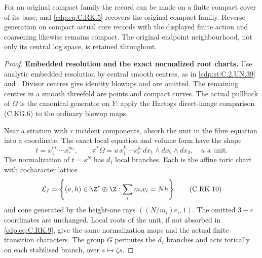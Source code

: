 \begin{proposition}
For an original compact family the record can
be made on a finite compact cover of its base,
and \eqref{cdp:eq:C.RK.5} recovers the original compact
family. Reverse generation on compact actual
core records with the displayed finite action
and coarsening likewise remains compact.
The original endpoint neighbourhood, not only
its central log space, is retained throughout.
\end{proposition}

\begin{proof}
\par\medskip\noindent\textbf{Embedded resolution and the exact normalized root charts.}
Use analytic embedded resolution by central
smooth centres, as in \ref{cdp:st:C.2.UN.39} and
\cite[Theorems~1.6 and1.10]{BierstoneMilman1997}.
Divisor centres give identity blowups and are
omitted. The remaining centres in a smooth
threefold are points and compact curves.
The actual pullback of $\Omega$ is the
canonical generator on $Y$: apply the
Hartogs direct-image comparison (C.KG.6)
to the ordinary blowup maps.

Near a stratum with $r$ incident components,
absorb the unit in the fibre equation into
a coordinate. The exact local equation and
volume form have the shape
\[
 t=x_1^{m_1}\cdots x_r^{m_r},\qquad
 \pi^*\Omega=u\,x_1^{k_1}\cdots x_r^{k_r}
                         dx_1\wedge dx_2\wedge dx_3,
                         \quad u\text{ a unit}.
\tag{C.RK.9}\label{cdp:eq:C.RK.9}
\]
The normalization of $t=s^N$ has $d_I$
local branches. Each is the affine toric
chart with cocharacter lattice
\[
 \mathcal L_I=\left\{(v,h)\in\Z^r\oplus\Z:
                         \sum_i m_iv_i=Nh\right\}
\tag{C.RK.10}\label{cdp:eq:C.RK.10}
\]
and cone generated by the height-one rays
$((N/m_i)e_i,1)$. The omitted $3-r$
coordinates are unchanged. Local roots of
the unit, if not absorbed in \eqref{cdp:eq:C.RK.9},
give the same normalization maps and
the actual finite transition characters.
The group $G$ permutes the $d_I$ branches
and acts torically on each stabilised
branch, over $s\mapsto\zeta s$.


\end{proof}
